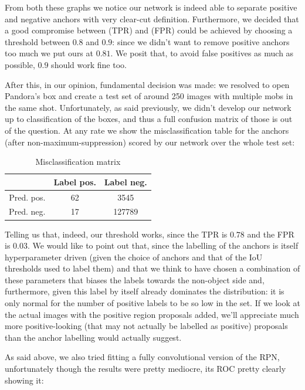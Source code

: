 \documentclass[10pt,journal,cspaper,compsoc]{IEEEtran}
\begin{document}
    From both these graphs we notice our network is indeed able to separate positive and negative anchors with very clear-cut definition. Furthermore, we decided that a good compromise between (TPR) and (FPR) could be achieved by choosing a threshold between $0.8$ and $0.9$: since we didn't want to remove positive anchors too much we put ours at $0.81$. We posit that, to avoid false positives as much as possible, $0.9$ should work fine too.

    After this, in our opinion, fundamental decision was made: we resolved to open Pandora's box and create a test set of around 250 images with multiple mobs in the same shot. Unfortunately, as said previously, we didn't develop our network up to classification of the boxes, and thus a full confusion matrix of those is out of the question. At any rate we show the misclassification table for the anchors (after non-maximum-suppression) scored by our network over the whole test set:

    \begin{table}
        \centering
        \begin{tabular}{r|c c}
            & Label pos. & Label neg. \\
            \hline
            Pred. pos. & 62 & 3545 \\
            Pred. neg. & 17 & 127789
        \end{tabular}
        \caption{Misclassification matrix}
        \label{tab:miscl}
    \end{table}

    Telling us that, indeed, our threshold works, since the TPR is $0.78$ and the FPR is $0.03$. We would like to point out that, since the labelling of the anchors is itself hyperparameter driven (given the choice of anchors and that of the IoU thresholds used to label them) and that we think to have chosen a combination of these parameters that biases the labels towards the non-object side and, furthermore, given this label by itself already dominates the distribution: it is only normal for the number of positive labels to be so low in the set. If we look at the actual images with the positive region proposals added, we'll appreciate much more positive-looking (that may not actually be labelled as positive) proposals than the anchor labelling would actually suggest.

    As said above, we also tried fitting a fully convolutional version of the RPN, unfortunately though the results were pretty mediocre, its ROC pretty clearly showing it:
\end{document}
